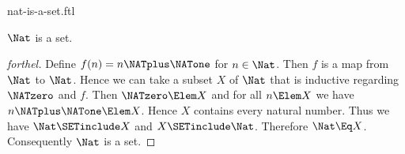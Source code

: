 \documentclass{stex}
\begin{document}
\begin{smodule}{nat-is-a-set.ftl}

\begin{proposition}[forthel,id=ARITHMETIC_07_4685510236547454]
  $\Nat$ is a set.
\end{proposition}
\begin{proof}[forthel]
  Define $f(n) = n \NATplus \NATone$ for $n \in \Nat$.
  Then $f$ is a map from $\Nat$ to $\Nat$.
  Hence we can take a subset $X$ of $\Nat$ that is inductive regarding
  $\NATzero$ and $f$.
  Then $\NATzero \Elem X$ and for all $n \Elem X$ we have $n \NATplus \NATone \Elem X$.
  Hence $X$ contains every natural number.
  Thus we have $\Nat \SETinclude X$ and $X \SETinclude \Nat$.
  Therefore $\Nat \Eq X$.
  Consequently $\Nat$ is a set.
\end{proof}
\end{smodule}
\end{document}
